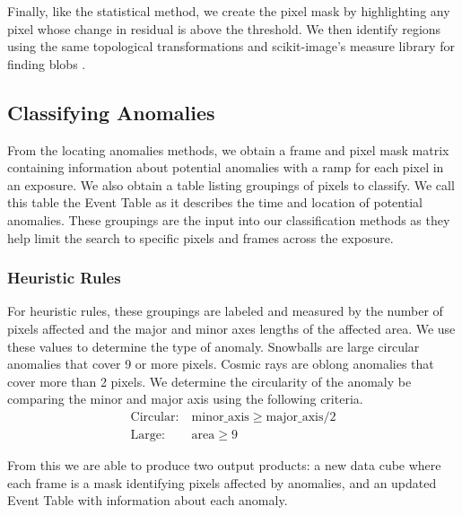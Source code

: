 Finally, like the statistical method, we create the pixel mask by highlighting any pixel whose change in residual is above the threshold.
We then identify regions using the same topological transformations and scikit-image's measure library for finding blobs \cite{scikit-image}.

\subsection{Classifying Anomalies}
From the locating anomalies methods, we obtain a frame and pixel mask matrix containing information about potential anomalies with a ramp for each pixel in an exposure. 
We also obtain a table listing groupings of pixels to classify. We call this table the Event Table as it describes the time and location of potential anomalies. 
These groupings are the input into our classification methods as they help limit the search to specific pixels and frames across the exposure. 

\subsubsection{Heuristic Rules}
For heuristic rules, these groupings are labeled and measured by the number of pixels affected and the major and minor axes lengths of the affected area. 
We use these values to determine the type of anomaly.
Snowballs are large circular anomalies that cover 9 or more pixels.
Cosmic rays are oblong anomalies that cover more than 2 pixels. 
We determine the circularity of the anomaly be comparing the minor and major axis using the following criteria.
\begin{align*}
    \text{Circular:}\ &  \text{minor\_axis} \geq \text{major\_axis}/2 \\
    \text{Large:}\ & \text{area} \geq 9
\end{align*}

From this we are able to produce two output products: a new data cube where each frame is a mask identifying pixels affected by anomalies, and an updated Event Table with information about each anomaly. 

